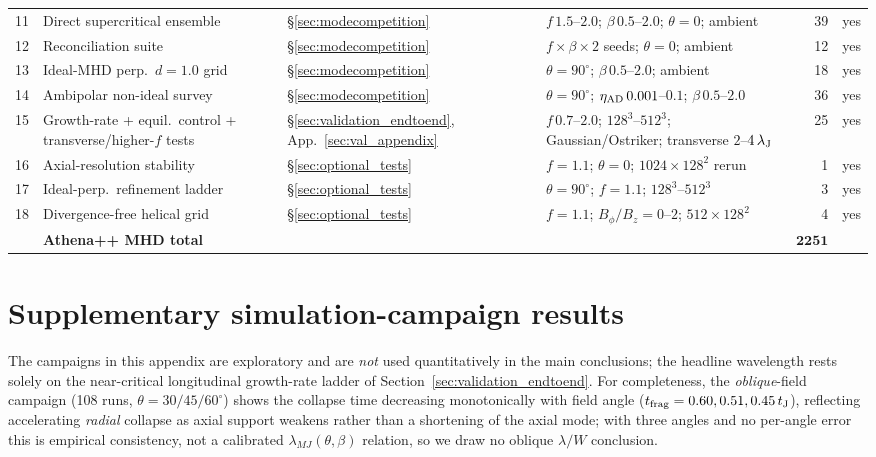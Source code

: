 \documentclass[usenatbib,twoside,twocolumn]{mnras}
\begin{document}
\begin{table}
\begin{tabular}{@{}c p{3.4cm} l p{4.0cm} r l@{}}
11 & Direct supercritical ensemble & \S\ref{sec:modecompetition} & $f\,1.5$--$2.0$; $\beta\,0.5$--$2.0$; $\theta=0$; ambient & 39 & yes \\
12 & Reconciliation suite & \S\ref{sec:modecompetition} & $f\times\beta\times2$ seeds; $\theta=0$; ambient & 12 & yes \\
13 & Ideal-MHD perp.\ $d=1.0$ grid & \S\ref{sec:modecompetition} & $\theta=90^\circ$; $\beta\,0.5$--$2.0$; ambient & 18 & yes \\
14 & Ambipolar non-ideal survey & \S\ref{sec:modecompetition} & $\theta=90^\circ$; $\eta_{\rm AD}\,0.001$--$0.1$; $\beta\,0.5$--$2.0$ & 36 & yes \\
15 & Growth-rate + equil.\ control + transverse/higher-$f$ tests & \S\ref{sec:validation_endtoend}, App.~\ref{sec:val_appendix} & $f\,0.7$--$2.0$; $128^3$--$512^3$; Gaussian/Ostriker; transverse $2$--$4\,\lambda_{\rm J}$ & 25 & yes \\
16 & Axial-resolution stability & \S\ref{sec:optional_tests} & $f=1.1$; $\theta=0$; $1024\times128^2$ rerun & 1 & yes \\
17 & Ideal-perp.\ refinement ladder & \S\ref{sec:optional_tests} & $\theta=90^\circ$; $f=1.1$; $128^3$--$512^3$ & 3 & yes \\
18 & Divergence-free helical grid & \S\ref{sec:optional_tests} & $f=1.1$; $B_\phi/B_z=0$--$2$; $512\times128^2$ & 4 & yes \\
\midrule
   & \textbf{Athena++ MHD total} & & & $\boldsymbol{2251}$ & \\
\bottomrule
\end{tabular}
\end{table}

\section{Supplementary simulation-campaign results}
\label{sec:supplementary_campaigns_app}

The campaigns in this appendix are exploratory and are \emph{not} used quantitatively in the main conclusions; the headline wavelength rests solely on the near-critical longitudinal growth-rate ladder of Section~\ref{sec:validation_endtoend}. For completeness, the \emph{oblique}-field campaign (108 runs, $\theta=30/45/60^\circ$) shows the collapse time decreasing monotonically with field angle ($t_{\rm frag}=0.60,0.51,0.45\,t_{\rm J}$), reflecting accelerating \emph{radial} collapse as axial support weakens rather than a shortening of the axial mode; with three angles and no per-angle error this is empirical consistency, not a calibrated $\lambda_{MJ}(\theta,\beta)$ relation, so we draw no oblique $\lambda/W$ conclusion.
\end{document}
